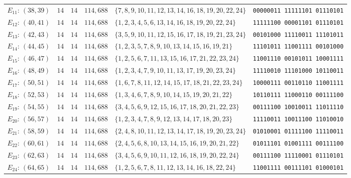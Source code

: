 \documentclass[
  aps,
  pra,
  reprint,
  superscriptaddress,
  amsmath,
  amssymb,
  nofootinbib,
  floatfix
]{revtex4-2}
\theoremstyle{definition}
\theoremstyle{remark}
\begin{document}
\begin{table}[t]
\begin{ruledtabular}
\begin{tabular}{lrrrlc}
$E_{11}:\,(38,39)$ & $14$ & $14$ & $114{,}688$ & $\{7,8,9,10,11,12,13,14,16,18,19,20,22,24\}$ & \texttt{00000011\,11111101\,01110101} \\
$E_{12}:\,(40,41)$ & $14$ & $14$ & $114{,}688$ & $\{1,2,3,4,5,6,13,14,16,18,19,20,22,24\}$ & \texttt{11111100\,00001101\,01110101} \\
$E_{13}:\,(42,43)$ & $14$ & $14$ & $114{,}688$ & $\{3,5,9,10,11,12,15,16,17,18,19,21,23,24\}$ & \texttt{00101000\,11110011\,11101011} \\
$E_{14}:\,(44,45)$ & $14$ & $14$ & $114{,}688$ & $\{1,2,3,5,7,8,9,10,13,14,15,16,19,21\}$ & \texttt{11101011\,11001111\,00101000} \\
$E_{15}:\,(46,47)$ & $14$ & $14$ & $114{,}688$ & $\{1,2,5,6,7,11,13,15,16,17,21,22,23,24\}$ & \texttt{11001110\,00101011\,10001111} \\
$E_{16}:\,(48,49)$ & $14$ & $14$ & $114{,}688$ & $\{1,2,3,4,7,9,10,11,13,17,19,20,23,24\}$ & \texttt{11110010\,11101000\,10110011} \\
$E_{17}:\,(50,51)$ & $14$ & $14$ & $114{,}688$ & $\{1,6,7,8,11,12,14,15,17,18,21,22,23,24\}$ & \texttt{10000111\,00110110\,11001111} \\
$E_{18}:\,(52,53)$ & $14$ & $14$ & $114{,}688$ & $\{1,3,4,6,7,8,9,10,14,15,19,20,21,22\}$ & \texttt{10110111\,11000110\,00111100} \\
$E_{19}:\,(54,55)$ & $14$ & $14$ & $114{,}688$ & $\{3,4,5,6,9,12,15,16,17,18,20,21,22,23\}$ & \texttt{00111100\,10010011\,11011110} \\
$E_{20}:\,(56,57)$ & $14$ & $14$ & $114{,}688$ & $\{1,2,3,4,7,8,9,12,13,14,17,18,20,23\}$ & \texttt{11110011\,10011100\,11010010} \\
$E_{21}:\,(58,59)$ & $14$ & $14$ & $114{,}688$ & $\{2,4,8,10,11,12,13,14,17,18,19,20,23,24\}$ & \texttt{01010001\,01111100\,11110011} \\
$E_{22}:\,(60,61)$ & $14$ & $14$ & $114{,}688$ & $\{2,4,5,6,8,10,13,14,15,16,19,20,21,22\}$ & \texttt{01011101\,01001111\,00111100} \\
$E_{23}:\,(62,63)$ & $14$ & $14$ & $114{,}688$ & $\{3,4,5,6,9,10,11,12,16,18,19,20,22,24\}$ & \texttt{00111100\,11110001\,01110101} \\
$E_{24}:\,(64,65)$ & $14$ & $14$ & $114{,}688$ & $\{1,2,5,6,7,8,11,12,13,14,16,18,22,24\}$ & \texttt{11001111\,00111101\,01000101}
\end{tabular}
\end{ruledtabular}
\end{table}
\end{document}
